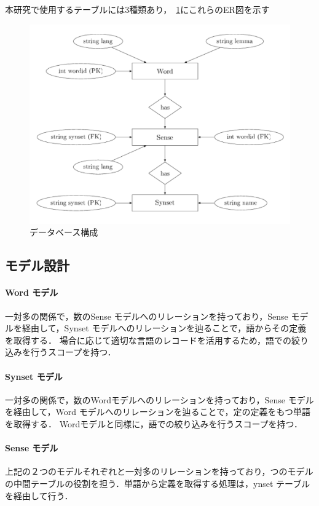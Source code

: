 \documentclass[a4j, 10pt, twocolumn]{ujarticle}
\begin{document}
本研究で使用するテーブルには3種類あり，~\ref{fig:er_diagram}にこれらのER図を示す

\begin{figure}[htbp]
  \centering
  \includegraphics[scale = 0.4]{img/er_diagram.pdf}
  \caption{データベース構成}
  \label{fig:er_diagram}
\end{figure}

\subsection{モデル設計}

\paragraph{Word モデル}
一対多の関係で，数のSense モデルへのリレーションを持っており，Sense モデルを経由して，Synset モデルへのリレーションを辿ることで，語からその定義を取得する．
場合に応じて適切な言語のレコードを活用するため，語での絞り込みを行うスコープを持つ．

\paragraph{Synset モデル}
一対多の関係で，数のWordモデルへのリレーションを持っており，Sense モデルを経由して，Word モデルへのリレーションを辿ることで，定の定義をもつ単語を取得する．
Wordモデルと同様に，語での絞り込みを行うスコープを持つ．

\paragraph{Sense モデル}
上記の２つのモデルそれぞれと一対多のリレーションを持っており，つのモデルの中間テーブルの役割を担う．単語から定義を取得する処理は，ynset テーブルを経由して行う．
\end{document}
